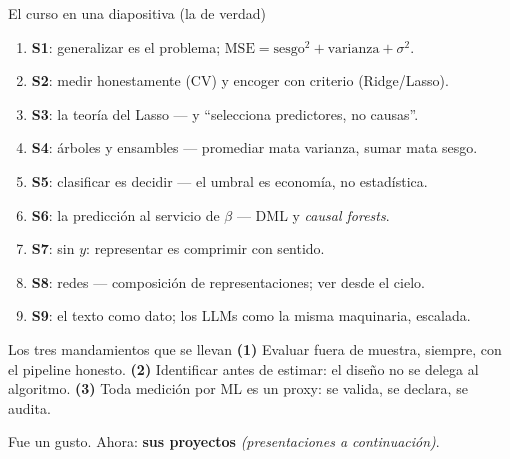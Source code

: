 \documentclass{beamer}
\newcommand{\1}{\mathbb{I}}
\newcommand{\MSE}{\mathrm{MSE}}
\begin{document}
\begin{frame}{El curso en una diapositiva (la de verdad)}
\small
\begin{enumerate}\itemsep4pt
  \item \textbf{S1}: generalizar es el problema; $\MSE = \text{sesgo}^2 + \text{varianza} + \sigma^2$.
  \item \textbf{S2}: medir honestamente (CV) y encoger con criterio (Ridge/Lasso).
  \item \textbf{S3}: la teoría del Lasso --- y ``selecciona predictores, no causas''.
  \item \textbf{S4}: árboles y ensambles --- promediar mata varianza, sumar mata sesgo.
  \item \textbf{S5}: clasificar es decidir --- el umbral es economía, no estadística.
  \item \textbf{S6}: la predicción al servicio de $\beta$ --- DML y \emph{causal forests}.
  \item \textbf{S7}: sin $y$: representar es comprimir con sentido.
  \item \textbf{S8}: redes --- composición de representaciones; ver desde el cielo.
  \item \textbf{S9}: el texto como dato; los LLMs como la misma maquinaria, escalada.
\end{enumerate}
\pause

\vspace{0.15cm}
\begin{block}{Los tres mandamientos que se llevan}
\textbf{(1)} Evaluar fuera de muestra, siempre, con el pipeline honesto. \textbf{(2)} Identificar antes de estimar: el diseño no se delega al algoritmo. \textbf{(3)} Toda medición por ML es un proxy: se valida, se declara, se audita.
\end{block}
\pause

\vspace{0.1cm}
\centering
Fue un gusto. Ahora: \textbf{sus proyectos} \emph{(presentaciones a continuación)}.
\end{frame}
\end{document}
